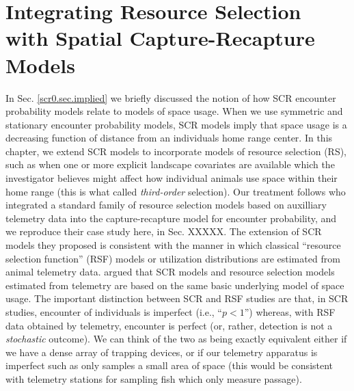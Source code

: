 \chapter{
Integrating Resource Selection 
with
Spatial Capture-Recapture
Models}

\label{chapt.rsf}


\vspace{.3in}

In Sec. \ref{scr0.sec.implied} we briefly discussed the notion of how
SCR encounter probability models relate to models of space usage.
When we use symmetric and stationary encounter probability models, SCR
models imply that space usage is a decreasing function of distance
from an individuals home range center.  In this chapter, we extend SCR
models to incorporate models of resource selection (RS), such as when
one or more explicit landscape covariates are available which the
investigator believes might affect how individual animals use space
within their home range (this is what \citep{johnson:1980} called {\it
  third-order} selection).  Our treatment follows
\citet{royle_etal:2012mee} who integrated a standard family of
resource selection models based on auxilliary telemetry data into the
capture-recapture model for encounter probability, and we reproduce
their case study here, in Sec. XXXXX.  The extension of SCR models
they proposed is consistent with the manner in which classical
``resource selection function'' (RSF) models \citep{manly_etal:2002}
or utilization distributions \citep{worton:1989, fieberg:2005,
  fieberg:2007} are estimated from animal telemetry data.
\citet{royle_etal:2012mee} argued that SCR models and resource
selection models estimated from telemetry are based on the same basic
underlying model of space usage. The important distinction between SCR
and RSF studies are that, in SCR studies, encounter of individuals is
imperfect (i.e., ``$p<1$'') whereas, with RSF data obtained by
telemetry, encounter is perfect (or, rather, detection is not a {\it
  stochastic} outcome). We can think of the two as being exactly
equivalent either if we have a dense array of trapping devices, or if
our telemetry apparatus is imperfect such as only samples a small area
of space (this would be consistent with telemetry stations for
sampling fish which only measure passage).



